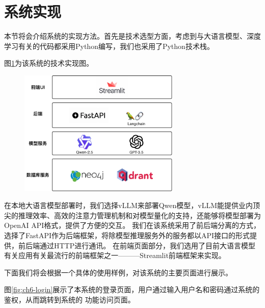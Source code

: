 \section{系统实现}

本节将会介绍系统的实现方法。首先是技术选型方面，考虑到与大语言模型、深度学习有关的代码都采用Python编写，我们也采用了Python技术栈。

图\ref{fig:ch6-implementation}为该系统的技术实现图。

\begin{figure}[H]
  \vspace{1em}
  \centering
  \setlength{\abovecaptionskip}{10pt} %
  \includegraphics[height=6cm]{../assets/ch5-系统实现图.pdf}
  \label{fig:ch6-implementation}
\end{figure}

在本地大语言模型部署时，我们选择vLLM来部署Qwen模型，vLLM能提供业内顶尖的推理效率、高效的注意力管理机制和对模型量化的支持，还能够将模型部署为OpenAI API格式，提供了方便的交互。
我们在该系统采用了前后端分离的方式，选择了FastAPI作为后端框架，将除模型推理服务外的服务都以API接口的形式提供，前后端通过HTTP进行通讯。
在前端页面部分，我们选用了目前大语言模型有关应用有关最流行的前端框架之一———Streamlit前端框架来实现。


下面我们将会根据一个具体的使用样例，对该系统的主要页面进行展示。

图\ref{fig:ch6-login}展示了本系统的登录页面，用户通过输入用户名和密码通过系统的鉴权，从而跳转到系统的
功能访问页面。

